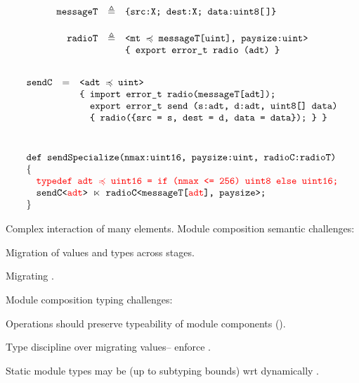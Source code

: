 $$
\begin{array}{rcl}
\texttt{messageT} &\triangleq& \texttt{\{src:X; dest:X; data:uint8[\,]\}} \\[5mm]
\texttt{radioT} &\triangleq& \texttt{<mt $\preccurlyeq$ messageT[uint], paysize:uint>} \\
 & & \texttt{\{\ export\  error\_t\ radio (adt)\ \}}\\[5mm]
\end{array} 
$$
$$
\begin{array}{lcl}
\texttt{sendC} & = & \texttt{<adt $\subtype$ uint>}\\
&& \texttt{\{ import error\_t radio(messageT[adt]);}\\
&& \texttt{\phantom{\{ }export error\_t send (s:adt, d:adt, uint8[] data)}\\
&& \texttt{\phantom{\{ }\{ radio(\{src = s, dest = d, data = data\}); \}\ \}}\\[10mm]
\multicolumn{3}{l}{\texttt{def sendSpecialize(nmax:uint16, paysize:uint, radioC:radioT)}}\\
\{\\
\multicolumn{3}{l}{\quad \texttt{\color{red}{typedef adt $\subtype$ uint16 = if (nmax <= 256) uint8 else uint16;}}}\\
\multicolumn{3}{l}{\quad \texttt{sendC<{\color{red}adt}> $\ltimes$ radioC<messageT[{\color{red}adt}], paysize>;}}\\
\}
\end{array}
$$

\stopslide


Complex interaction of many elements. Module composition semantic challenges:
\begin{citemize}
\item Migration of values and types across stages.
\begin{citemize}
\item Migrating .
\end{citemize}
\end{citemize}
Module composition typing challenges:
\begin{citemize}
\item Operations should preserve typeability of module components ().
\item Type discipline over migrating values-- enforce .
\item Static module types may be  (up to subtyping bounds) wrt 
dynamically .
\end{citemize}


